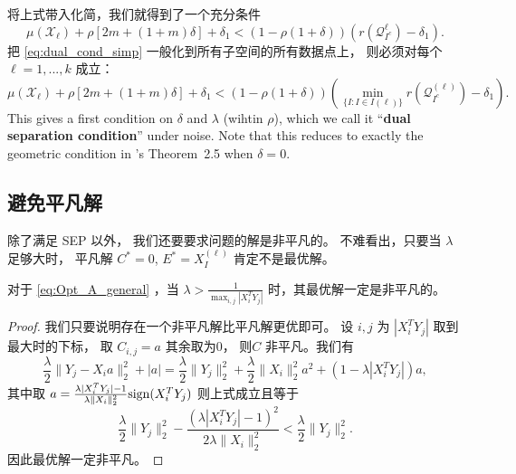 \documentclass{ctexart}
\begin{document}
将上式带入化简，我们就得到了一个充分条件
\begin{equation}\label{eq:dual_cond_simp}
  \mu(\mathcal{X}_{\ell}) +\rho [2m+(1+m)\delta] +\delta_1
  < \left(1-\rho(1+\delta)\right)(r(\mathcal{Q}_{I^c}^{\ell})-\delta_1).
\end{equation}
把 \eqref{eq:dual_cond_simp} 一般化到所有子空间的所有数据点上，
则必须对每个$\ell = 1,...,k$ 成立：
\begin{equation}\label{eq:Thm1_all}
  \mu(\mathcal{X}_{\ell}) +\rho [2m+(1+m)\delta] +\delta_1
  < \left(1-\rho(1+\delta)\right)\left(\min_{\{I: I\in I(\ell)\}}r(\mathcal{Q}^{(\ell)}_{I^c})-\delta_1\right).
\end{equation}
This gives a first condition on $\delta$ and $\lambda$ (wihtin $\rho$), which we call it ``\textbf{dual separation condition}'' under noise. Note that this reduces to exactly the geometric condition in \cite{soltanolkotabi2011geometric}'s Theorem~2.5 when $\delta=0$.

\subsection{避免平凡解}\label{sec:avoid_trivial}
除了满足 SEP 以外， 我们还要要求问题的解是非平凡的。 不难看出，只要当 $\lambda$
足够大时， 平凡解 $C^* = 0$, $E^*=X_I^{(\ell)}$ 肯定不是最优解。

\begin{lemma}\label{lemma:avoid_trivial}
  对于 \eqref{eq:Opt_A_general} ，当 $\lambda > \frac{1}{\max_{i,j} |X_i^T
Y_j|}$ 时，其最优解一定是非平凡的。
\end{lemma}

\begin{proof}
  我们只要说明存在一个非平凡解比平凡解更优即可。 设 $i, j$ 为 $|X_i^T
  Y_j|$ 取到最大时的下标， 取 $C_{i,j} = a$ 其余取为$0$， 则$C$
  非平凡。我们有
  $$ \frac{\lambda}{2} \|Y_j - X_i a \|_2^2 + |a| = \frac{\lambda}{2}
  \|Y_j\|_2^2 + \frac{\lambda}{2} \|X_i\|_2^2 a^2 +\left( 1-\lambda |X_i^T Y_j|
  \right)a, $$
  其中取 $a = \frac{\lambda |X_i^T Y_j|-1}{\lambda \|X_i\|_2^2} \mathrm{sign}(X_i^T Y_j)$
  则上式成立且等于
  $$ \frac{\lambda}{2} \|Y_j\|_2^2 - \frac{(\lambda|X_i^T Y_j| -1)^2}
  {2 \lambda \|X_i\|_2^2 } < \frac{\lambda}{2} \|Y_j\|_2^2. $$
  因此最优解一定非平凡。
\end{proof}
\end{document}
